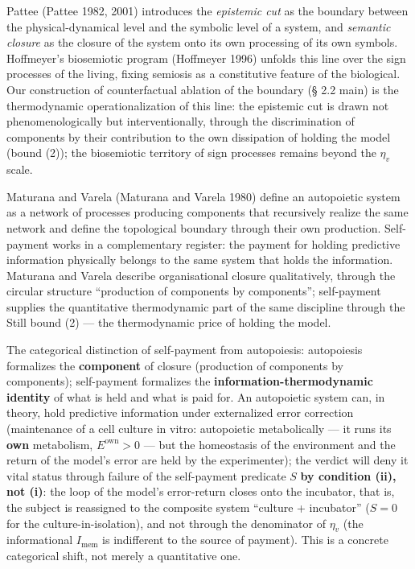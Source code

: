 \documentclass[pdflatex,sn-mathphys-ay]{sn-jnl}
\begin{document}
Pattee (Pattee 1982, 2001) introduces the \emph{epistemic cut} as the boundary between the physical-dynamical level and the symbolic level of a system, and \emph{semantic closure} as the closure of the system onto its own processing of its own symbols. Hoffmeyer's biosemiotic program (Hoffmeyer 1996) unfolds this line over the sign processes of the living, fixing semiosis as a constitutive feature of the biological. Our construction of counterfactual ablation of the boundary (§ 2.2 main) is the thermodynamic operationalization of this line: the epistemic cut is drawn not phenomenologically but interventionally, through the discrimination of components by their contribution to the own dissipation of holding the model (bound (2)); the biosemiotic territory of sign processes remains beyond the \(\eta_v\) scale.

Maturana and Varela (Maturana and Varela 1980) define an autopoietic system as a network of processes producing components that recursively realize the same network and define the topological boundary through their own production. Self-payment works in a complementary register: the payment for holding predictive information physically belongs to the same system that holds the information. Maturana and Varela describe organisational closure qualitatively, through the circular structure ``production of components by components''; self-payment supplies the quantitative thermodynamic part of the same discipline through the Still bound (2) --- the thermodynamic price of holding the model.

The categorical distinction of self-payment from autopoiesis: autopoiesis formalizes the \textbf{component} of closure (production of components by components); self-payment formalizes the \textbf{information-thermodynamic identity} of what is held and what is paid for. An autopoietic system can, in theory, hold predictive information under externalized error correction (maintenance of a cell culture in vitro: autopoietic metabolically --- it runs its \textbf{own} metabolism, \(E^{\text{own}} > 0\) --- but the homeostasis of the environment and the return of the model's error are held by the experimenter); the verdict will deny it vital status through failure of the self-payment predicate \(S\) \textbf{by condition (ii), not (i)}: the loop of the model's error-return closes onto the incubator, that is, the subject is reassigned to the composite system ``culture + incubator'' (\(S = 0\) for the culture-in-isolation), and not through the denominator of \(\eta_v\) (the informational \(I_{\text{mem}}\) is indifferent to the source of payment). This is a concrete categorical shift, not merely a quantitative one.
\end{document}
